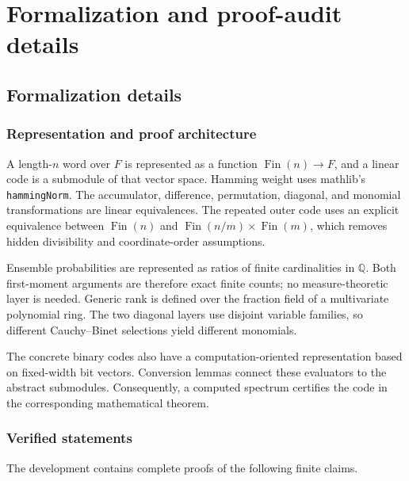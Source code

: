 \section{Formalization and proof-audit details}

\subsection{Formalization details}
\label{app:formalization}

\subsubsection{Representation and proof architecture}

A length-$n$ word over $F$ is represented as a function
$\operatorname{Fin}(n)\to F$, and a linear code is a submodule of that vector
space.  Hamming weight uses mathlib's \texttt{hammingNorm}.  The accumulator,
difference, permutation, diagonal, and monomial transformations are linear
equivalences.  The repeated outer code uses an explicit equivalence between
$\operatorname{Fin}(n)$ and
$\operatorname{Fin}(n/m)\times\operatorname{Fin}(m)$, which removes hidden
divisibility and coordinate-order assumptions.

Ensemble probabilities are represented as ratios of finite cardinalities in
$\mathbb Q$.  Both first-moment arguments are therefore exact finite counts;
no measure-theoretic layer is needed.  Generic rank is defined over the fraction
field of a multivariate polynomial ring.  The two diagonal layers use disjoint
variable families, so different Cauchy--Binet selections yield different
monomials.

The concrete binary codes also have a computation-oriented representation based
on fixed-width bit vectors.  Conversion lemmas connect these evaluators to the
abstract submodules.  Consequently, a computed spectrum certifies the code in
the corresponding mathematical theorem.

\subsubsection{Verified statements}

The development contains complete proofs of the following finite claims.

